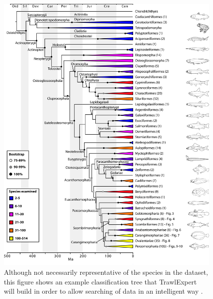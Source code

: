 \documentclass{article}
\begin{document}
\begin{figure}[p]
\centering
\includegraphics[width=16cm]{TreeFig.jpg}

\caption{Although not necessarily representative of the species in the dataset, this figure shows an example classification tree that TrawlExpert will build in order to allow searching of data in an intelligent way \citep{plosblog2014}.}
\label{fig:Tree}
\end{figure}
\end{document}
